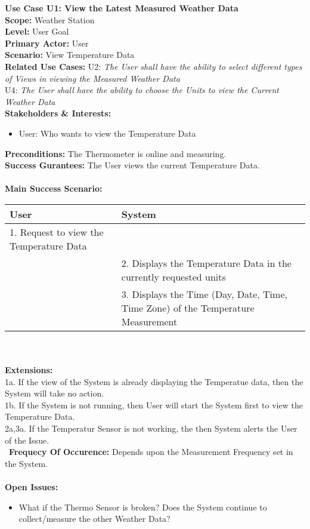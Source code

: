 \documentclass[letterpaper]{article}
\begin{document}
\noindent
\textbf{Use Case U1:  View the Latest Measured Weather Data}\\
\textbf{Scope:  }Weather Station\\
\textbf{Level:  }User Goal\\
\textbf{Primary Actor:  }User\\
\textbf{Scenario:  }View Temperature Data\\
\textbf{Related Use Cases:  }U2: \textit{The User shall have the
ability to select different types of Views in viewing the Measured
Weather Data}\\ U4:  \textit{The User shall have the ability to
choose the Units to view the Current Weather Data}\\
\textbf{Stakeholders \& Interests:  }
\begin{itemize}
\item User:  Who wants to view the Temperature Data
\end{itemize}
\textbf{Preconditions:  }The Thermometer is online and measuring.\\
\textbf{Success Gurantees:  }The User views the current Temperature
Data.\\\\
\textbf{Main Success Scenario:  }\\
\begin{tabular}{|p{6cm}|p{6cm}|}\hline
\textbf{User} & \textbf{System}\\\hline
1.  Request to view the Temperature Data & \\\hline
& 2.  Displays the Temperature Data in the currently requested
units\\\hline
& 3.  Displays the Time (Day, Date, Time, Time Zone) of the
Temperature Measurement\\\hline
\end{tabular}\\\\
\textbf{Extensions:  }\\
1a.  If the view of the System is already displaying the Temperatue
data, then the System will take no action.\\
1b.  If the System is not running, then User will start the System
first to view the Temperature Data.\\
2a,3a.  If the Temperatur Sensor is not working, the then System
alerts the User of the Issue.\\\
\textbf{Frequecy Of Occurence: } Depends upon the Measurement
Frequency set in the System.\\\\
\textbf{Open Issues: }
\begin{itemize}
\item What if the Thermo Sensor is broken?  Does the System continue
to collect/measure the other Weather Data?
\end{itemize}
\end{document}
